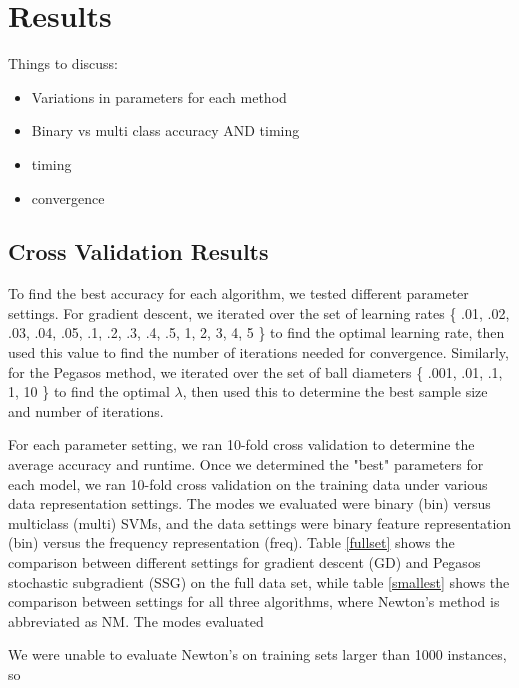 \documentclass[letterpaper, 11pt]{article}
\begin{document}
\section{Results}
Things to discuss:
\begin{itemize}
	\item Variations in parameters for each method
	\item Binary vs multi class accuracy AND timing
	\item timing
	\item convergence
\end{itemize}

\subsection{Cross Validation Results}

To find the best accuracy for each algorithm, we tested different parameter settings.  For gradient descent, we iterated over the set of learning rates \{ .01, .02, .03, .04, .05, .1, .2, .3, .4, .5, 1, 2, 3, 4, 5  \} to find the optimal learning rate, then used this value to find the number of iterations needed for convergence.  Similarly, for the Pegasos method, we iterated over the set of ball diameters \{ .001, .01, .1, 1, 10 \} to find the optimal $\lambda$, then used this to determine the best sample size and number of iterations.

For each parameter setting, we ran 10-fold cross validation to determine the average accuracy and runtime.  Once we determined the "best" parameters for each model, we ran 10-fold cross validation on the training data under various data representation settings.  The modes we evaluated were binary (bin) versus multiclass (multi) SVMs, and the data settings were binary feature representation (bin) versus the frequency representation (freq).  Table \ref{fullset} shows the comparison between different settings for gradient descent (GD) and Pegasos stochastic subgradient (SSG) on the full data set, while table \ref{smallest} shows the comparison between settings for all three algorithms, where Newton's method is abbreviated as NM.  The modes evaluated

We were unable to evaluate Newton's on training sets larger than 1000 instances, so 
\end{document}
